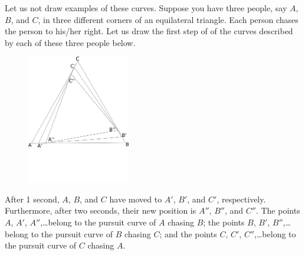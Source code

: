  \vspace{0.2cm}

Let us not draw examples of these curves. Suppose you have three people, say $A$, $B$, and $C$, in three different corners of an equilateral triangle. Each person chases the person to his/her right. Let us draw the first step of of the curves described by each of these three people below.
	\begin{figure}[H]
	   \centering
	   \includegraphics[width=0.4\textwidth]{season3/301/images/triangle1.png} 
	\end{figure}

After 1 second, $A$, $B$, and $C$ have moved to $A'$, $B'$, and $C'$, respectively. Furthermore, after two seconds, their new position is $A''$, $B''$, and $C''$. The points $A$, $A'$, $A''$,\dots belong to the pursuit curve of $A$ chasing $B$; the points $B$, $B'$, $B''$,\dots belong to the pursuit curve of $B$ chasing $C$; and the points $C$, $C'$, $C''$,\dots belong to the pursuit curve of $C$ chasing $A$. \\

